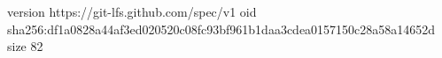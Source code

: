 version https://git-lfs.github.com/spec/v1
oid sha256:df1a0828a44af3ed020520c08fc93bf961b1daa3cdea0157150c28a58a14652d
size 82
